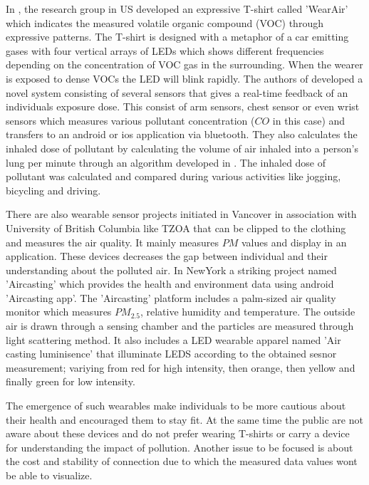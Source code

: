 In \cite{Kim2010}, the research group in US developed an expressive T-shirt called 'WearAir' which indicates the measured volatile organic compound (VOC) through expressive patterns. The T-shirt is designed with a metaphor of a car emitting gases with four vertical arrays of LEDs which shows different frequencies depending on the concentration of VOC gas in the surrounding. When the wearer is exposed to dense VOCs the LED will blink rapidly. 
The authors of \cite{Hu2014} developed a novel system consisting of several sensors that gives a real-time feedback of an individuals exposure dose. This consist of arm sensors, chest sensor or even wrist sensors which measures various pollutant concentration ($CO$ in this case) and transfers to an android or ios application via bluetooth. They also calculates the inhaled dose of pollutant by calculating the volume of air inhaled into a person's lung per minute through an algorithm developed in \cite{Valli2013}. The inhaled dose of pollutant was calculated and compared  during various activities like jogging, bicycling and driving.

 There are also wearable sensor projects initiated in Vancover in association with University of British Columbia like TZOA \cite{tzoa} that can be clipped to the clothing and measures the air quality. It mainly measures $PM$ values and display in an application. These devices decreases the gap between individual and their understanding about the polluted air. In NewYork a striking project named 'Aircasting'\cite{aircasting} which provides the health and environment data using android 'Aircasting app'. The 'Aircasting'\cite{Han2010} platform includes a palm-sized air quality monitor which measures $PM_{2.5}$, relative humidity and temperature. The outside air is drawn through a sensing chamber and the particles are measured through light scattering method. It also includes a LED wearable apparel named 'Air casting luminisence'\cite{Luminescence} that illuminate LEDS according to the obtained sesnor measurement; variying from red for high intensity, then orange, then yellow and finally green for low intensity. 
 
 The emergence of such wearables make individuals to be more cautious about their health and encouraged them to stay fit. At the same time the public are not aware about these devices and do not prefer wearing T-shirts or carry a device for understanding the impact of pollution. Another issue to be focused is about the cost and stability of  connection due to which the measured data values wont be able to visualize.



